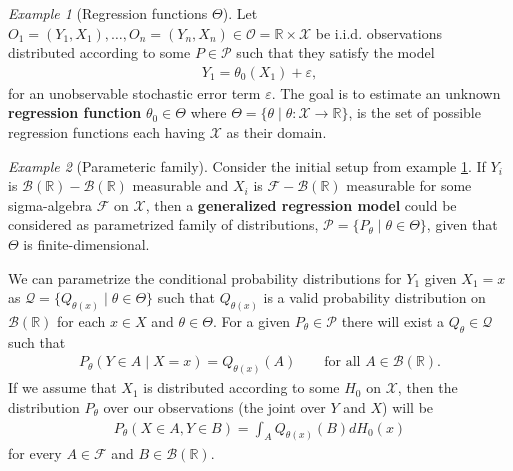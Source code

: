 \documentclass[11pt, a4paper]{article}
\theoremstyle{definition}
\theoremstyle{remark}
\newtheorem{example}{Example}
\begin{document}
\begin{example}[Regression functions $ \Theta $] \label{ex:regfunc}
    Let $ O_1 = (Y_1 , X_1) ,\ldots, O_n = (Y_n , X_n) \in  \mathcal{O} = \mathbb{R} \times \mathcal{X} $ be i.i.d. observations distributed according to some $ P \in \mathcal{P} $ such that they satisfy the model 
    \begin{align*}
        Y_1 = \theta_0(X_1) + \varepsilon,
    \end{align*}
    for an unobservable stochastic error term $ \varepsilon $. The goal is to estimate an unknown \textbf{regression function} $ \theta_0 \in \Theta $ where $ \Theta = \{\theta \mid \theta : \mathcal{X} \to \mathbb{R}\}$, is the set of possible regression functions each having $ \mathcal{X} $ as their domain. \cite{vaart06}
\end{example}
\begin{example}[Parameteric family] \label{ex:parametricfam}
    Consider the initial setup from example \ref{ex:regfunc}. If $ Y_i $ is $ \mathcal{B}(\mathbb{R})-\mathcal{B}(\mathbb{R}) $ measurable and $ X_i $ is $ \mathcal{F} - \mathcal{B}(\mathbb{R})  $ measurable for some sigma-algebra $ \mathcal{F} $ on $ \mathcal{X} $, then a \textbf{generalized regression model} could be considered as parametrized family of distributions, $ \mathcal{P} = \{P_{\theta} \mid \theta \in \Theta\} $, given that $ \Theta $ is finite-dimensional.

    We can parametrize the conditional probability distributions for $ Y_1 $ given $ X_1 = x $ as $ \mathcal{Q} = \{Q_{\theta(x)} \mid \theta \in \Theta \} $ such that $ Q_{\theta(x)} $ is a valid probability distribution on $ \mathcal{B}(\mathbb{R}) $ for each $ x \in X $ and $ \theta \in \Theta $. For a given $ P_{\theta} \in \mathcal{P} $ there will exist a $ Q_{\theta} \in \mathcal{Q} $ such that  
    \begin{align*}
        P_{\theta}(Y \in A \mid X = x) = Q_{ \theta(x)}(A) \qquad \text{for all } A \in \mathcal{B}(\mathbb{R}).
    \end{align*}
    If we assume that $ X_1 $ is distributed according to some $ H_0 $ on $ \mathcal{X} $, then the distribution $ P_{\theta} $ over our observations (the joint over $ Y $ and $ X $) will be
    \begin{align*}
        P_{\theta }(X \in A, Y \in B ) = \int_{A} Q_{\theta(x)}(B) d H_{0}(x) 
    \end{align*}
    for every $ A \in \mathcal{F} $ and $ B \in \mathcal{B}(\mathbb{R}) $. 
\end{example}
\end{document}

